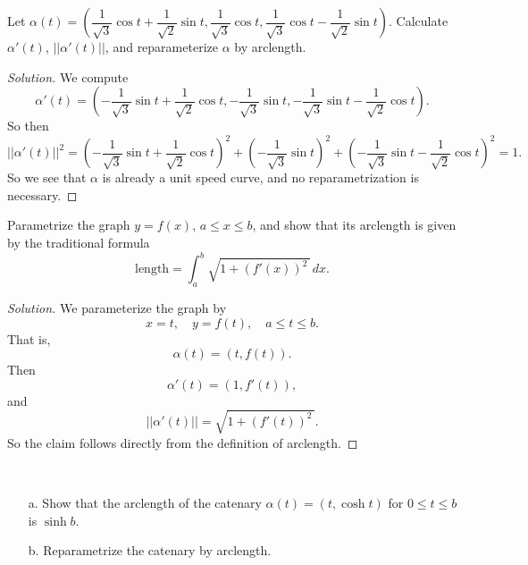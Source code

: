 \documentclass[Shifrin_Solutions_Spring_2018]{subfiles}
\begin{document}
\begin{exercise} Let
$\alpha (t) = \left( \dfrac{1}{\sqrt{3}} \cos t + \dfrac{1}{\sqrt{2}}\sin t , 
\dfrac{1}{\sqrt{3}}\cos t , \dfrac{1}{\sqrt{3}}\cos t - \dfrac{1}{\sqrt{2}}\sin t \right)$.
Calculate $\alpha'(t)$, $|| \alpha'(t)||$, and reparameterize $\alpha$ by arclength.
\end{exercise}

\begin{proof}[Solution]
We compute
\[
\alpha'(t) = \left(  -\dfrac{1}{\sqrt{3}}\sin t + \dfrac{1}{\sqrt{2}}\cos t ,
- \dfrac{1}{\sqrt{3}} \sin t ,
-\dfrac{1}{\sqrt{3}}\sin t - \dfrac{1}{\sqrt{2}}\cos t
\right) .
\]
So then
\[
||\alpha'(t)||^2 = \left( -\dfrac{1}{\sqrt{3}}\sin t + \dfrac{1}{\sqrt{2}}\cos t 
\right)^2 + \left( - \dfrac{1}{\sqrt{3}} \sin t \right)^2 + 
\left( -\dfrac{1}{\sqrt{3}}\sin t - \dfrac{1}{\sqrt{2}}\cos t \right)^2 = 1 .
\]
So we see that $\alpha$ is already a unit speed curve, and no reparametrization is necessary.
\end{proof}

\vspace{.5in}



\begin{exercise}
Parametrize the graph $y=f(x)$, $a\leq x \leq b$, and show that its arclength is given 
by the traditional formula
\[
\text{length} = \int_a^b \sqrt{1+(f'(x))^2\,}\, dx .
\]
\end{exercise}

\begin{proof}[Solution]
We parameterize the graph by
\[
x = t, \quad y = f(t), \quad a \leq t \leq b .
\]
That is,
\[
\alpha(t) = \left( t, f(t) \right).
\]
Then
\[
\alpha'(t) = \left( 1, f'(t) \right),
\]
and
\[||\alpha'(t)|| = \sqrt{1 + (f'(t))^2\,} .
\]
So the claim follows directly from the definition of arclength.
\end{proof}

\clearpage



\begin{exercise}{$\ $}
\begin{itemize}
\item[a.] Show that the arclength of the catenary $\alpha(t) = (t, \cosh t)$ for 
$0\leq t\leq b$ is $\sinh b$.

\item[b.] Reparametrize the catenary by arclength.
\end{itemize}
\end{exercise}
\end{document}
